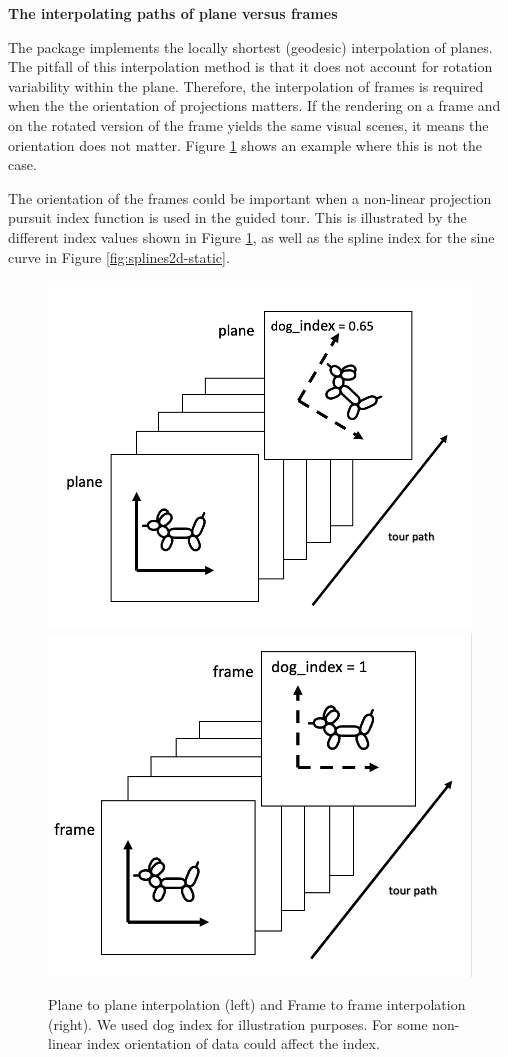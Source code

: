 \textbf{The interpolating paths of plane versus frames}

The  package implements the locally shortest (geodesic)
interpolation of planes. The pitfall of this interpolation method is
that it does not account for rotation variability within the plane.
Therefore, the interpolation of frames is required when the the
orientation of projections matters. If the rendering on a frame and on
the rotated version of the frame yields the same visual scenes, it means
the orientation does not matter. Figure \ref{fig:dogs} shows an example
where this is not the case.

The orientation of the frames could be important when a non-linear
projection pursuit index function is used in the guided tour. This is
illustrated by the different index values shown in Figure
\ref{fig:dogs}, as well as the spline index for the sine curve in Figure
\ref{fig:splines2d-static}.

\begin{Schunk}
\begin{figure}

{\centering \includegraphics[width=0.45\linewidth]{plane} \includegraphics[width=0.45\linewidth]{frame} 

}

\caption[Plane to plane interpolation (left) and Frame to frame interpolation (right)]{Plane to plane interpolation (left) and Frame to frame interpolation (right). We used dog index for illustration purposes. For some non-linear index orientation of data could affect the index.}\label{fig:dogs}
\end{figure}
\end{Schunk}

